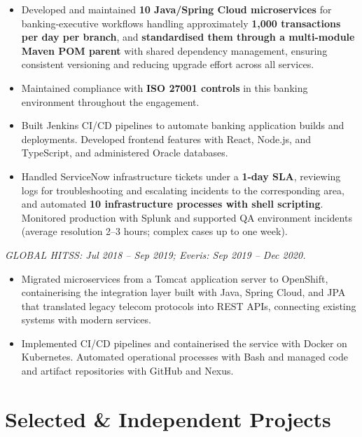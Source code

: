 {
\begin{itemize}
    \item Developed and maintained \textbf{10 Java/Spring Cloud microservices} for banking-executive workflows handling approximately \textbf{1,000 transactions per day per branch}, and \textbf{standardised them through a multi-module Maven POM parent} with shared dependency management, ensuring consistent versioning and reducing upgrade effort across all services.
    \item Maintained compliance with \textbf{ISO 27001 controls} in this banking environment throughout the engagement.
    \item Built Jenkins CI/CD pipelines to automate banking application builds and deployments. Developed frontend features with React, Node.js, and TypeScript, and administered Oracle databases.
    \item Handled ServiceNow infrastructure tickets under a \textbf{1-day SLA}, reviewing logs for troubleshooting and escalating incidents to the corresponding area, and automated \textbf{10 infrastructure processes with shell scripting}. Monitored production with Splunk and supported QA environment incidents (average resolution 2--3 hours; complex cases up to one week).
\end{itemize}

\textit{GLOBAL HITSS: Jul 2018 -- Sep 2019; Everis: Sep 2019 -- Dec 2020.}\par\vspace{3pt}
\begin{itemize}
    \item Migrated microservices from a Tomcat application server to OpenShift, containerising the integration layer built with Java, Spring Cloud, and JPA that translated legacy telecom protocols into REST APIs, connecting existing systems with modern services.
    \item Implemented CI/CD pipelines and containerised the service with Docker on Kubernetes. Automated operational processes with Bash and managed code and artifact repositories with GitHub and Nexus.
\end{itemize}

\section*{Selected \& Independent Projects}

}
